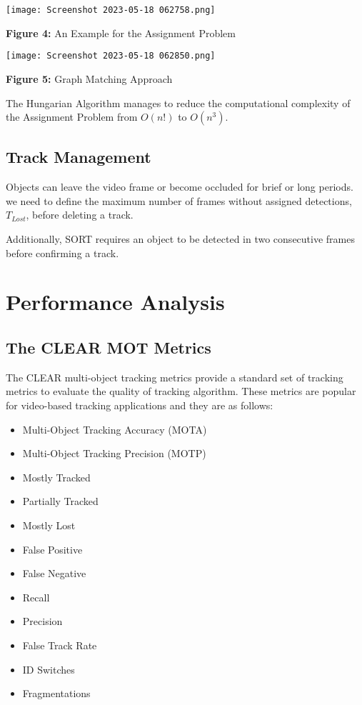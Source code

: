 \documentclass[11pt]{article}
\begin{document}
\begin{center}
\texttt{[image: Screenshot 2023-05-18 062758.png]}

\textbf{Figure 4:} An Example for the Assignment Problem 
\end{center}

\begin{center}
\texttt{[image: Screenshot 2023-05-18 062850.png]}

\textbf{Figure 5:} Graph Matching Approach 
\end{center}
		
		The Hungarian Algorithm manages to reduce the computational complexity of the Assignment Problem from $O(n!)$ to $O(n^3)$.
	\subsection{Track Management}
	Objects can leave the video frame or become occluded for brief or long periods. we need to define the maximum number of frames without assigned detections, $T_{Lost}$, before deleting a track.
	
	Additionally, SORT requires an object to be detected in two consecutive frames before confirming a track.
\section{Performance Analysis}
	\subsection{The CLEAR MOT Metrics}
	The CLEAR multi-object tracking metrics provide a standard set of tracking metrics to evaluate the quality of tracking algorithm. These metrics are popular for video-based tracking applications and they are as follows:
	\begin{itemize}
	\item Multi-Object Tracking Accuracy (MOTA)
	\item Multi-Object Tracking Precision (MOTP)
	\item Mostly Tracked
	\item Partially Tracked 
	\item Mostly Lost     
	\item False Positive    
	\item False Negative    
	\item Recall    
	\item Precision    
	\item False Track Rate    
	\item ID Switches    
	\item Fragmentations
	\end{itemize}
	
\end{document}
